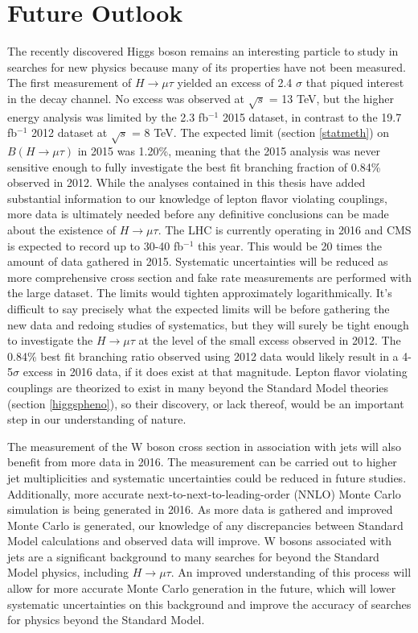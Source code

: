 \documentclass[oneside, letterpaper, oldfontcommands]{memoir}
\let\oldbib
\renewcommand*{}{\SingleSpace\oldbib}
\begin{document}
\section{Future Outlook}
\qquad The recently discovered Higgs boson remains an interesting particle to study in searches for new physics because many of its properties have not been measured. The first measurement of $H \rightarrow \mu\tau$ yielded an excess of 2.4 $\sigma$ that piqued interest in the decay channel. No excess was observed at $\sqrt{s}$ = 13 TeV, but the higher energy analysis was limited by the 2.3 fb$^{-1}$ 2015 dataset, in contrast to the 19.7 fb$^{-1}$ 2012 dataset at $\sqrt{s}$ = 8 TeV. The expected limit (section \ref{statmeth}) on $B(H \rightarrow \mu \tau)$ in 2015 was 1.20\%, meaning that the 2015 analysis was never sensitive enough to fully investigate the best fit branching fraction of 0.84\% observed in 2012. While the analyses contained in this thesis have added substantial information to our knowledge of lepton flavor violating couplings, more data is ultimately needed before any definitive conclusions can be made about the existence of $H \rightarrow \mu\tau$. The LHC is currently operating in 2016 and CMS is expected to record up to 30-40 fb$^{-1}$ this year. This would be 20 times the amount of data gathered in 2015. Systematic uncertainties will be reduced as more comprehensive cross section and fake rate measurements are performed with the large dataset. The limits would tighten approximately logarithmically. It's difficult to say precisely what the expected limits will be before gathering the new data and redoing studies of systematics, but they will surely be tight enough to investigate the $H \rightarrow \mu\tau$ at the level of the small excess observed in 2012. The 0.84\% best fit branching ratio observed using 2012 data would likely result in a 4-5$\sigma$ excess in 2016 data, if it does exist at that magnitude. Lepton flavor violating couplings are theorized to exist in many beyond the Standard Model theories (section \ref{higgspheno}), so their discovery, or lack thereof, would be an important step in our understanding of nature.


\qquad The measurement of the W boson cross section in association with jets will also benefit from more data in 2016. The measurement can be carried out to higher jet multiplicities and systematic uncertainties could be reduced in future studies. Additionally, more accurate next-to-next-to-leading-order (NNLO) Monte Carlo simulation is being generated in 2016. As more data is gathered and improved Monte Carlo is generated, our knowledge of any discrepancies between Standard Model calculations and observed data will improve. W bosons associated with jets are a significant background to many searches for beyond the Standard Model physics, including $H \rightarrow \mu\tau$. An improved understanding of this process will allow for more accurate Monte Carlo generation in the future, which will lower systematic uncertainties on this background and improve the accuracy of searches for physics beyond the Standard Model.



%
%


\end{document}
